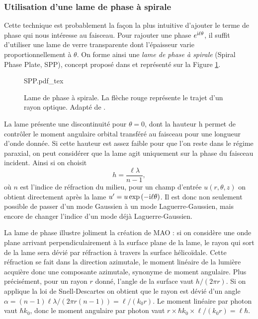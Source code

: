 \subsubsection{Utilisation d'une lame de phase à spirale}
Cette technique est probablement la façon la plus intuitive d'ajouter le terme de phase qui nous intéresse au faisceau. Pour rajouter une phase $e^{\mathrm{i}\ell\theta}$, il suffit d'utiliser une lame de verre transparente dont l'épaisseur varie proportionnellement à $\theta$. On forme ainsi une \textit{lame de phase à spirale} (Spiral Phase Plate, SPP), concept proposé dans  et représenté sur la Figure \ref{Fig:SPP}.\par
\begin{figure}[!ht]
\centering
\def\svgwidth{0.5\columnwidth}
{SPP.pdf_tex}
\caption{Lame de phase à spirale. La flèche rouge représente le trajet d'un rayon optique. Adapté de .}
\label{Fig:SPP}
\end{figure}
La lame présente une discontinuité pour $\theta=0$\degres, dont la hauteur h permet de contrôler le moment angulaire orbital transféré au faisceau pour une longueur d'onde donnée. Si cette hauteur est assez faible pour que l'on reste dans le régime paraxial, on peut considérer que la lame agit uniquement sur la phase du faisceau incident. Ainsi si on choisit 
\begin{equation*}
h = \frac{\ell\lambda}{n-1},
\end{equation*}
où $n$ est l'indice de réfraction du milieu, pour un champ d'entrée $u(r,\theta,z)$ on obtient directement après la lame $u' = u\exp{(-\mathrm{i}\ell \theta)}$.	Il est donc non seulement possible de passer d'un mode Gaussien à un mode Laguerre-Gaussien, mais encore de changer l'indice d'un mode déjà Laguerre-Gaussien.\par
La lame de phase illustre joliment la création de MAO : si on considère une onde plane arrivant perpendiculairement à la surface plane de la lame, le rayon qui sort de la lame sera dévié par réfraction à travers la surface hélicoïdale. Cette réfraction se fait dans la direction azimutale, le moment linéaire de la lumière acquière donc une composante azimutale, synonyme de moment angulaire. Plus précisément, pour un rayon $r$ donné, l'angle de la surface	vaut $h/(2\pi r)$. Si on applique la loi de Snell-Descartes on obtient que le rayon est dévié d'un angle $\alpha = (n-1)\ell\lambda/(2\pi r(n-1)) = \ell/(k_0r)$. Le moment linéaire par photon vaut $\hbar k_0$, donc le moment angulaire par photon vaut $r\times\hbar k_0\times\ell/(k_0r) = \ell\hbar$.


